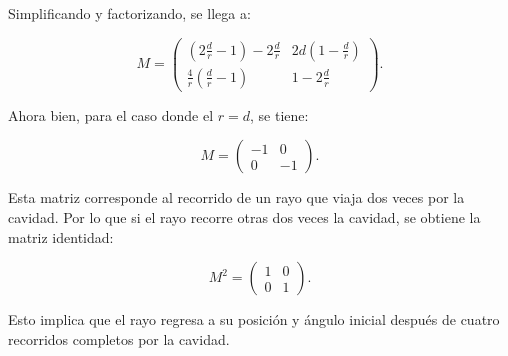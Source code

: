 \documentclass[11pt]{article}
\begin{document}
Simplificando y factorizando, se llega a:

\[
M = \begin{pmatrix} (2\frac{d}{r} - 1) - 2\frac{d}{r}& 2d\left(1 - \frac{d}{r}\right) \\[8pt] \frac{4}{r}(\frac{d}{r} - 1) & 1 - 2\frac{d}{r} \end{pmatrix}.
\]

Ahora bien, para el caso donde el \(r = d\), se tiene:

\[
M = \begin{pmatrix} -1 & 0 \\[8pt] 0 & -1 \end{pmatrix}.
\]

Esta matriz corresponde al recorrido de un rayo que viaja dos veces por la cavidad. Por lo que si el rayo recorre otras dos veces la cavidad, se obtiene la matriz identidad:

\[
M^2 = \begin{pmatrix} 1 & 0 \\[8pt] 0 & 1 \end{pmatrix}.
\]

Esto implica que el rayo regresa a su posición y ángulo inicial después de cuatro recorridos completos por la cavidad.
\end{document}
